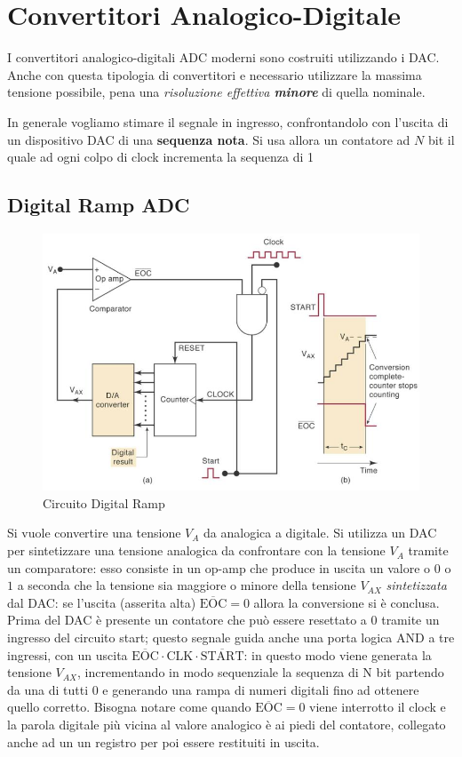\documentclass[
]{book}
\begin{document}
\section{Convertitori
Analogico-Digitale}\label{convertitori-analogico-digitale}

I convertitori analogico-digitali ADC moderni sono costruiti utilizzando
i DAC. Anche con questa tipologia di convertitori e necessario
utilizzare la massima tensione possibile, pena una \emph{risoluzione
effettiva \textbf{minore}} di quella nominale.

In generale vogliamo stimare il segnale in ingresso, confrontandolo con
l'uscita di un dispositivo DAC di una \textbf{sequenza nota}. Si usa
allora un contatore ad \(N\) bit il quale ad ogni colpo di clock
incrementa la sequenza di 1

\subsection{Digital Ramp ADC}\label{digital-ramp-adc}

\begin{figure}
\centering
\includegraphics[width=0.5\linewidth,height=\textheight,keepaspectratio]{immagini/43.png}
\caption{Circuito Digital Ramp}
\end{figure}

Si vuole convertire una tensione \(V_A\) da analogica a digitale. Si
utilizza un DAC per sintetizzare una tensione analogica da confrontare
con la tensione \(V_{A}\) tramite un comparatore: esso consiste in un
op-amp che produce in uscita un valore o \(0\) o \(1\) a seconda che la
tensione sia maggiore o minore della tensione \(V_{AX}\)
\emph{sintetizzata} dal DAC: se l'uscita (asserita alta)
\(\overline{\text{EOC}}=0\) allora la conversione si è conclusa.\newline
Prima del DAC è presente un contatore che può essere resettato a 0
tramite un ingresso del circuito start; questo segnale guida anche una
porta logica AND a tre ingressi, con un uscita
\(\overline{\text{EOC}}\cdot\text{CLK}\cdot\overline{\text{START}}\): in
questo modo viene generata la tensione \(V_{AX}\), incrementando in modo
sequenziale la sequenza di N bit partendo da una di tutti 0 e generando
una rampa di numeri digitali fino ad ottenere quello corretto.\newline
Bisogna notare come quando \(\overline{\text{EOC}}=0\) viene interrotto
il clock e la parola digitale più vicina al valore analogico è ai piedi
del contatore, collegato anche ad un un registro per poi essere
restituiti in uscita.
\end{document}
